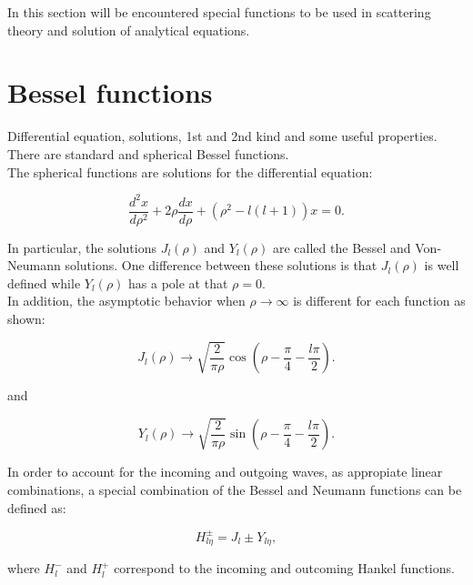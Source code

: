 \documentclass[openany]{book}
\begin{document}
In this section will be encountered special functions to be used in scattering theory and solution of analytical equations.

\section{Bessel functions} \label{sec:bessel}

Differential equation, solutions, 1st and 2nd kind and some useful properties. There are standard and spherical Bessel functions. \\

The spherical functions are solutions for the differential equation:

\begin{equation} \label{eq:special_bessel_diffEquation}
	\frac{d^2x}{d\rho^2} + 2\rho \frac{dx}{d\rho} + (\rho^2 - l(l+1))x= 0.
\end{equation}

In particular, the solutions $J_l(\rho)$ and $Y_l(\rho)$ are called the Bessel and Von-Neumann solutions. One difference between these solutions is that $J_l(\rho)$ is well defined while $Y_l(\rho)$  has a pole at that $\rho = 0$.   \\

In addition, the asymptotic behavior when $\rho \rightarrow \infty$ is different for each function as shown:

\begin{equation} \label{eq:special_bessel_J}
	J_l(\rho) \rightarrow \sqrt{ \frac{2}{\pi\rho}}\cos{\left(\rho - \frac{\pi}{4} - \frac{l\pi}{2}\right)}.
\end{equation}

and


\begin{equation} \label{eq:special_bessel_Y}
	Y_l(\rho) \rightarrow \sqrt{\frac{2}{\pi\rho}}\sin{\left(\rho - \frac{\pi}{4} - \frac{l\pi}{2}\right)}.
\end{equation}

In order to account for the incoming and outgoing waves, as appropiate linear combinations, a special combination of the Bessel and Neumann functions can be defined as:

\begin{equation}\label{eq:special_hankel}
	H^{\pm}_{l\eta} = J_{l} \pm Y_{l\eta},
\end{equation}

where $H^{-}_{l}$ and $H^{+}_{l}$ correspond to the incoming and outcoming Hankel functions. \\
\end{document}

